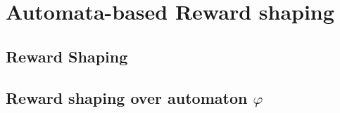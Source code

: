 \chapter{Automata-based Reward shaping}

\section{Reward Shaping}
\section{Reward shaping over automaton $\varphi$}